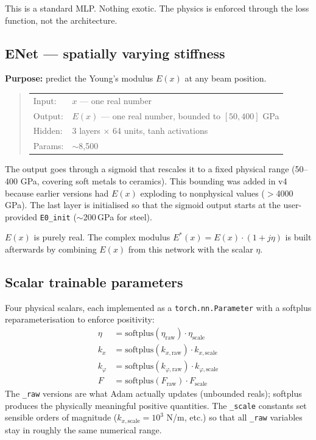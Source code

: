 \documentclass[11pt,a4paper]{article}
\begin{document}
This is a standard MLP. Nothing exotic. The physics is enforced through the loss function, not the architecture.

\subsection{ENet --- spatially varying stiffness}

\textbf{Purpose:} predict the Young's modulus $E(x)$ at any beam position.

\begin{quote}
\small
\begin{tabular}{ll}
Input:  & $x$ --- one real number \\
Output: & $E(x)$ --- one real number, bounded to $[50, 400]$ GPa \\
Hidden: & 3 layers $\times$ 64 units, tanh activations \\
Params: & $\sim$8{,}500 \\
\end{tabular}
\end{quote}

The output goes through a sigmoid that rescales it to a fixed physical range (50--400 GPa, covering soft metals to ceramics). This bounding was added in v4 because earlier versions had $E(x)$ exploding to nonphysical values ($>$4000 GPa). The last layer is initialised so that the sigmoid output starts at the user-provided \texttt{E0\_init} ($\sim$200\,GPa for steel).

$E(x)$ is purely real. The complex modulus $E^*(x) = E(x) \cdot (1 + j\eta)$ is built afterwards by combining $E(x)$ from this network with the scalar $\eta$.

\subsection{Scalar trainable parameters}

Four physical scalars, each implemented as a \texttt{torch.nn.Parameter} with a softplus reparameterisation to enforce positivity:
\begin{align}
\eta       &= \text{softplus}(\eta_\text{raw}) \cdot \eta_\text{scale} \\
k_x        &= \text{softplus}(k_{x,\text{raw}}) \cdot k_{x,\text{scale}} \\
k_\varphi  &= \text{softplus}(k_{\varphi,\text{raw}}) \cdot k_{\varphi,\text{scale}} \\
F          &= \text{softplus}(F_\text{raw}) \cdot F_\text{scale}
\end{align}
The \texttt{\_raw} versions are what Adam actually updates (unbounded reals); softplus produces the physically meaningful positive quantities. The \texttt{\_scale} constants set sensible orders of magnitude ($k_{x,\text{scale}} = 10^3$ N/m, etc.) so that all \texttt{\_raw} variables stay in roughly the same numerical range.
\end{document}
